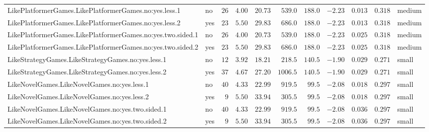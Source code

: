 \documentclass[6pt]{article}
\begin{document}
\begin{landscape}
{\begin{longtable}{llrrrrrrrrl}
LikePlatformerGames.LikePlatformerGames.no:yes.less.1&no&$26$&$4.00$&$20.73$&$ 539.0$&$188.0$&$-2.23$&$0.013$&$0.318$&medium\tabularnewline
LikePlatformerGames.LikePlatformerGames.no:yes.less.2&yes&$23$&$5.50$&$29.83$&$ 686.0$&$188.0$&$-2.23$&$0.013$&$0.318$&medium\tabularnewline
LikePlatformerGames.LikePlatformerGames.no:yes.two.sided.1&no&$26$&$4.00$&$20.73$&$ 539.0$&$188.0$&$-2.23$&$0.025$&$0.318$&medium\tabularnewline
LikePlatformerGames.LikePlatformerGames.no:yes.two.sided.2&yes&$23$&$5.50$&$29.83$&$ 686.0$&$188.0$&$-2.23$&$0.025$&$0.318$&medium\tabularnewline
LikeStrategyGames.LikeStrategyGames.no:yes.less.1&no&$12$&$3.92$&$18.21$&$ 218.5$&$140.5$&$-1.90$&$0.029$&$0.271$&small\tabularnewline
LikeStrategyGames.LikeStrategyGames.no:yes.less.2&yes&$37$&$4.67$&$27.20$&$1006.5$&$140.5$&$-1.90$&$0.029$&$0.271$&small\tabularnewline
LikeNovelGames.LikeNovelGames.no:yes.less.1&no&$40$&$4.33$&$22.99$&$ 919.5$&$ 99.5$&$-2.08$&$0.018$&$0.297$&small\tabularnewline
LikeNovelGames.LikeNovelGames.no:yes.less.2&yes&$ 9$&$5.50$&$33.94$&$ 305.5$&$ 99.5$&$-2.08$&$0.018$&$0.297$&small\tabularnewline
LikeNovelGames.LikeNovelGames.no:yes.two.sided.1&no&$40$&$4.33$&$22.99$&$ 919.5$&$ 99.5$&$-2.08$&$0.036$&$0.297$&small\tabularnewline
LikeNovelGames.LikeNovelGames.no:yes.two.sided.2&yes&$ 9$&$5.50$&$33.94$&$ 305.5$&$ 99.5$&$-2.08$&$0.036$&$0.297$&small\tabularnewline
\hline
\end{longtable}}\end{landscape}
\end{document}
